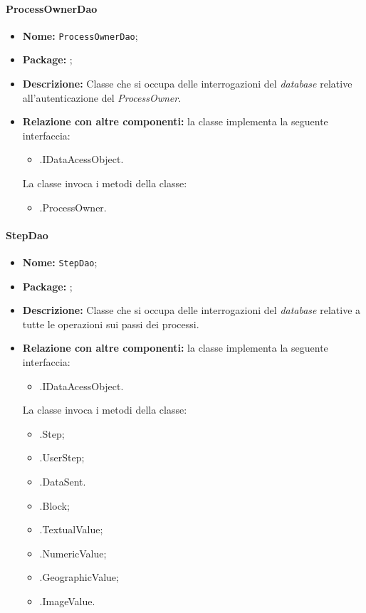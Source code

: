\paragraph{ProcessOwnerDao}
\begin{itemize}
\item \textbf{Nome:} \texttt{ProcessOwnerDao};
\item \textbf{Package:} \texttt{\smodel{}};
\item \textbf{Descrizione:} Classe che si occupa delle interrogazioni del \textit{database} relative all'autenticazione del \textit{ProcessOwner}.
\item \textbf{Relazione con altre componenti:} la classe implementa la seguente interfaccia:
		\begin{itemize}
			\item \smodel{}.IDataAcessObject.
		\end{itemize}
		La classe invoca i metodi della classe:
		\begin{itemize}
			\item \smodel{}.ProcessOwner.
		\end{itemize}
\end{itemize}

\paragraph{StepDao}
\begin{itemize}
\item \textbf{Nome:} \texttt{StepDao};
\item \textbf{Package:} \texttt{\smodel{}};
\item \textbf{Descrizione:} Classe che si occupa delle interrogazioni del \textit{database} relative a tutte le operazioni sui passi dei processi.
\item \textbf{Relazione con altre componenti:} la classe implementa la seguente interfaccia:
		\begin{itemize}
			\item \smodel{}.IDataAcessObject.
		\end{itemize}
		La classe invoca i metodi della classe:
		\begin{itemize}
			\item \smodel{}.Step;
			\item \smodel{}.UserStep;
			\item \smodel{}.DataSent.
			\item \smodel{}.Block;
			\item \smodel{}.TextualValue;
			\item \smodel{}.NumericValue;
			\item \smodel{}.GeographicValue;
			\item \smodel{}.ImageValue.			
		\end{itemize}
\end{itemize}

